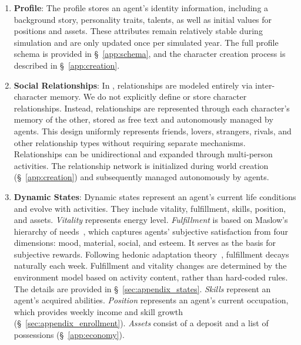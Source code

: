 \begin{enumerate}
    \item \textbf{Profile}:
    The profile stores an agent's identity information, including a background story, personality traits, talents, as well as initial values for positions and assets. 
    These attributes remain relatively stable during simulation and are only updated once per simulated year.
    The full profile schema is provided in \S~\ref{app:schema}, and the character creation process is described in \S~\ref{app:creation}.
    
    \item \textbf{Social Relationships}:
    In \method, relationships are modeled entirely via inter-character memory.
    We do not explicitly define or store character relationships.
    Instead, relationships are represented through each character's memory of the other, stored as free text and autonomously managed by agents.
    This design uniformly represents friends, lovers, strangers, rivals, and other relationship types without requiring separate mechanisms.
    Relationships can be unidirectional and expanded through multi-person activities.
    The relationship network is initialized during world creation (\S~\ref{app:creation}) and subsequently managed autonomously by agents.
    
    \item \textbf{Dynamic States}:
    Dynamic states represent an agent's current life conditions and evolve with activities.
    They include vitality, fulfillment, skills, position, and assets.
    \textit{Vitality} represents energy level. 
    \textit{Fulfillment} is based on Maslow's hierarchy of needs~\citep{maslow1943theory}, which captures agents' subjective satisfaction from four dimensions: mood, material, social, and esteem.
    It serves as the basis for subjective rewards.
    Following hedonic adaptation theory~\citep{Headey2014}, fulfillment decays naturally each week.
    Fulfillment and vitality changes are determined by the environment model based on activity content, rather than hard-coded rules.
    The details are provided in \S~\ref{sec:appendix_states}.
    \textit{Skills} represent an agent's acquired abilities.
    \textit{Position} represents an agent's current occupation, which provides weekly income and skill growth (\S~\ref{sec:appendix_enrollment}).
    \textit{Assets} consist of a deposit and a list of possessions (\S~\ref{app:economy}).
    
\end{enumerate}


